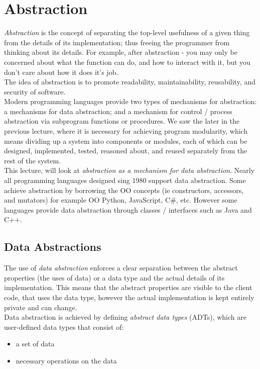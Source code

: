 
\section{Abstraction}
\textit{Abstraction} is the concept of separating the top-level usefulness of a given thing from the details of its implementation; thus freeing the programmer from thinking about its details. For example, after abstraction - you may only be concerned about what the function can do, and how to interact with it, but you don't care about how it does it's job.\\

The idea of abstraction is to promote readability, maintainability, reusability, and security of software.\\

Modern programming languages provide two types of mechanisms for abstraction: a mechanisms for data abstraction; and a mechanism for control / process abstraction via subprogram functions or procedures. We saw the later in the previous lecture, where it is necessary for achieving program modularity, which means dividing up a system into components or modules, each of which can be designed, implemented, tested, reasoned about, and reused separately from the rest of the system.\\

This lecture, will look at \textit{abstraction as a mechanism for data abstraction}. Nearly all programming languages designed sing 1980 support data abstraction. Some achieve abstraction by borrowing the OO concepts (ie constructors, accessors, and mutators) for example OO Python, JavaScript, C\#, etc. However some languages provide data abstraction through classes / interfaces such as Java and C++.

\subsection{Data Abstractions}
The use of \textit{data abstraction} enforces a clear separation between the abstract properties (the uses of data) or a data type and the actual details of its implementation. This means that the abstract properties are visible to the client code, that uses the data type, however the actual implementation is kept entirely private and can change.\\

Data abstraction is achieved by defining \textit{abstract data types} (ADTs), which are user-defined data types that consist of:
\begin{itemize}
    \item a set of data
    \item necessary operations on the data
\end{itemize}

